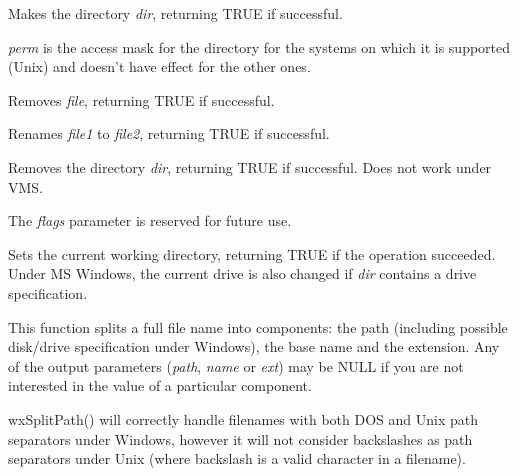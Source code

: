 

Makes the directory {\it dir}, returning TRUE if successful.

{\it perm} is the access mask for the directory for the systems on which it is
supported (Unix) and doesn't have effect for the other ones.



Removes {\it file}, returning TRUE if successful.



Renames {\it file1} to {\it file2}, returning TRUE if successful.



Removes the directory {\it dir}, returning TRUE if successful. Does not work under VMS.

The {\it flags} parameter is reserved for future use.



Sets the current working directory, returning TRUE if the operation succeeded.
Under MS Windows, the current drive is also changed if {\it dir} contains a drive specification.

\label{wxsplitfunction}


This function splits a full file name into components: the path (including possible disk/drive
specification under Windows), the base name and the extension. Any of the output parameters
({\it path}, {\it name} or {\it ext}) may be NULL if you are not interested in the value of
a particular component.

wxSplitPath() will correctly handle filenames with both DOS and Unix path separators under
Windows, however it will not consider backslashes as path separators under Unix (where backslash
is a valid character in a filename).

